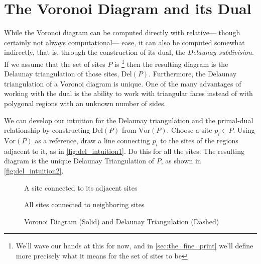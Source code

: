 \documentclass[12pt,twoside]{reedthesis}
\begin{document}


  \section{The Voronoi Diagram and its Dual} %
  \label{sec:the_voronoi_diagram_and_its_dual}
    While the Voronoi diagram can be computed directly with relative--- though certainly not always computational--- ease, it can also be computed somewhat indirectly, that is, through the construction of its dual, the \emph{Delaunay subdivision}. If we assume that the set of sites $P$ is \footnote{We'll wave our hands at this for now, and in \cref{sec:the_fine_print} we'll define more precisely what it means for the set of sites to be } then the resulting diagram is the Delaunay triangulation of those sites, $\mbox{Del}(P)$. Furthermore, the Delaunay triangulation of a Voronoi diagram is unique. One of the many advantages of working with the dual is the ability to work with triangular faces instead of with polygonal regions with an unknown number of sides. \par

    We can develop our intuition for the Delaunay triangulation and the primal-dual relationship by constructing $\mbox{Del}(P)$ from $\mbox{Vor}(P)$. Choose a site $p_{i} \in P$. Using $\mbox{Vor}(P)$ as a reference, draw a line connecting $p_{i}$ to the sites of the regions adjacent to it, as in \cref{fig:del_intuition1}. Do this for all the sites. The resulting diagram is the unique Delaunay Triangulation of $P$, as shown in \cref{fig:del_intuition2}.

    \begin{figure}[!htb]
      \centering
      \begin{subtable}{.475\textwidth}
        
        \caption{A site connected to its adjacent sites}
        \label{fig:del_intuition1}
      \end{subtable}%
      \begin{subtable}{.475\textwidth}
        
        \caption{All sites connected to neighboring sites}
        \label{fig:del_intuition2}
      \end{subtable}
      \caption{Voronoi Diagram (Solid) and Delaunay Triangulation (Dashed)}
      \label{fig:del_intuition}
    \end{figure}
\end{document}
